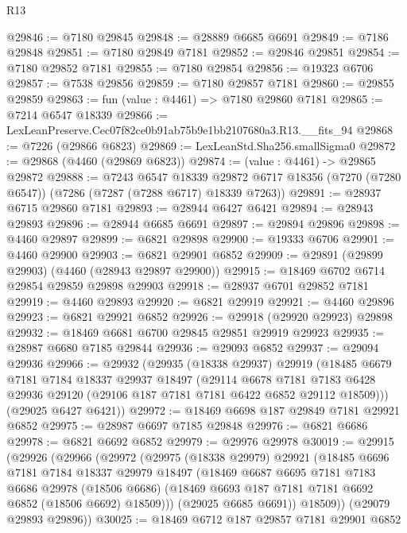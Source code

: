 \begin{lexlean}{R13}
\begin{coremodule}
@29846 := @7180 @29845
@29848 := @28889 @6685 @6691
@29849 := @7186 @29848
@29851 := @7180 @29849 @7181
@29852 := @29846 @29851
@29854 := @7180 @29852 @7181
@29855 := @7180 @29854
@29856 := @19323 @6706
@29857 := @7538 @29856
@29859 := @7180 @29857 @7181
@29860 := @29855 @29859
@29863 := fun (value : @4461) => @7180 @29860 @7181
@29865 := @7214 @6547 @18339
@29866 := LexLeanPreserve.Cec07f82ce0b91ab75b9e1bb2107680a3.R13.__fits_94
@29868 := @7226 (@29866 @6823)
@29869 := LexLeanStd.Sha256.smallSigma0
@29872 := @29868 (@4460 (@29869 @6823))
@29874 := (value : @4461) -> @29865 @29872
@29888 := @7243
    @6547
    @18339
    @29872
    @6717
    @18356
    (@7270 (@7280 @6547))
    (@7286 (@7287 (@7288 @6717) @18339 @7263))
@29891 := @28937 @6715 @29860 @7181
@29893 := @28944 @6427 @6421
@29894 := @28943 @29893
@29896 := @28944 @6685 @6691
@29897 := @29894 @29896
@29898 := @4460 @29897
@29899 := @6821 @29898
@29900 := @19333 @6706
@29901 := @4460 @29900
@29903 := @6821 @29901 @6852
@29909 := @29891 (@29899 @29903) (@4460 (@28943 @29897 @29900))
@29915 := @18469 @6702 @6714 @29854 @29859 @29898 @29903
@29918 := @28937 @6701 @29852 @7181
@29919 := @4460 @29893
@29920 := @6821 @29919
@29921 := @4460 @29896
@29923 := @6821 @29921 @6852
@29926 := @29918 (@29920 @29923) @29898
@29932 := @18469 @6681 @6700 @29845 @29851 @29919 @29923
@29935 := @28987 @6680 @7185 @29844
@29936 := @29093 @6852
@29937 := @29094 @29936
@29966 := @29932
    (@29935
      (@18338 @29937)
      @29919
      (@18485
        @6679
        @7181
        @7184
        @18337
        @29937
        @18497
        (@29114
          @6678
          @7181
          @7183
          @6428
          @29936
          @29120
          (@29106 @187 @7181 @7181 @6422 @6852 @29112 @18509)))
      (@29025 @6427 @6421))
@29972 := @18469 @6698 @187 @29849 @7181 @29921 @6852
@29975 := @28987 @6697 @7185 @29848
@29976 := @6821 @6686
@29978 := @6821 @6692 @6852
@29979 := @29976 @29978
@30019 := @29915
    (@29926
      (@29966
        (@29972
          (@29975
            (@18338 @29979)
            @29921
            (@18485
              @6696
              @7181
              @7184
              @18337
              @29979
              @18497
              (@18469
                @6687
                @6695
                @7181
                @7183
                @6686
                @29978
                (@18506 @6686)
                (@18469 @6693 @187 @7181 @7181 @6692 @6852 (@18506 @6692) @18509)))
            (@29025 @6685 @6691))
          @18509))
      (@29079 @29893 @29896))
@30025 := @18469 @6712 @187 @29857 @7181 @29901 @6852

\end{coremodule}
\end{lexlean}
